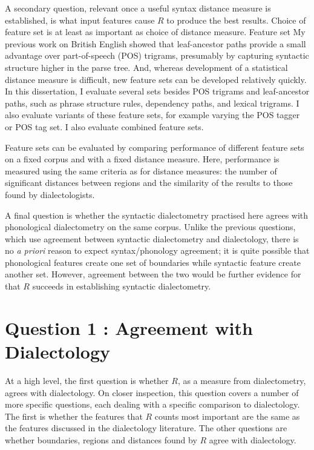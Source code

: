 A secondary question, relevant once a useful syntax distance measure
is established, is what input features cause $R$ to produce the best
results. Choice of feature set is at least as important as choice of
distance measure. Feature set My previous work on British English showed that
leaf-ancestor paths provide a small advantage over part-of-speech (POS)
trigrams, presumably by capturing syntactic structure higher in the
parse tree. And, whereas development of a statistical distance measure
is difficult, new feature sets can be developed relatively quickly.
In this dissertation, I evaluate several sets besides POS trigrams and
leaf-ancestor paths, such as phrase structure rules, dependency paths,
and lexical trigrams. I also evaluate variants of these feature sets,
for example varying the POS tagger or POS tag set. I also evaluate
combined feature sets.

Feature sets can be evaluated by comparing performance of different
feature sets on a fixed corpus and with a fixed distance
measure. Here, performance is measured using the same criteria as for
distance measures: the number of significant distances between regions
and the similarity of the results to those found by dialectologists.

A final question is whether the syntactic dialectometry practised here
agrees with phonological dialectometry on the same corpus. Unlike the
previous questions, which use agreement between syntactic
dialectometry and dialectology, there is no {\it a priori} reason to
expect syntax/phonology agreement; it is quite possible that
phonological features create one set of boundaries while syntactic
feature create another set. However, agreement between the two would
be further evidence for that $R$ succeeds in establishing syntactic
dialectometry.

\section{Question 1 : Agreement with Dialectology}

At a high level, the first question is whether $R$, as a measure from
dialectometry, agrees with dialectology. On closer inspection, this
question covers a number of more specific questions, each dealing with
a specific comparison to dialectology. The first is whether the
features that $R$ counts most important are the same as the features
discussed in the dialectology literature. The other questions are
whether boundaries, regions and distances found by $R$ agree with
dialectology.

